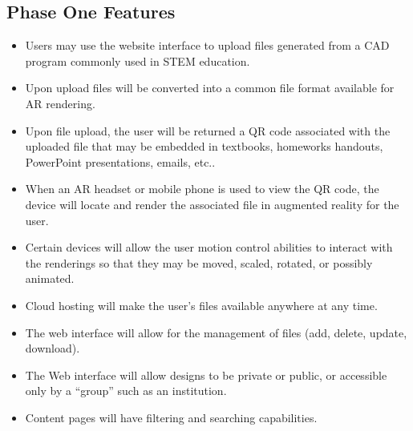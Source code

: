 \subsection{Phase One Features}
\begin{itemize}
	\item Users may use the website interface to upload files generated from a CAD program commonly used in STEM education. 
	\item  Upon upload files will be converted into a common file format available for AR rendering. 
	\item Upon file upload, the user will be returned a QR code associated with the uploaded file that may be embedded in textbooks, homeworks handouts, PowerPoint presentations, emails, etc..
	\item When an AR headset or mobile phone is used to view the QR code, the device will locate and render the associated file in augmented reality for the user.  
	\item Certain devices will allow the user motion control abilities to interact with the renderings so that they may be moved, scaled, rotated, or possibly animated. 
	\item Cloud hosting will make the user’s files available anywhere at any time. 
	\item The web interface will allow for the management of files (add, delete, update, download). 
	\item The Web interface will allow designs to be private or public, or accessible only by a “group” such as an institution.
	\item Content pages will have filtering and searching capabilities.
\end{itemize}

